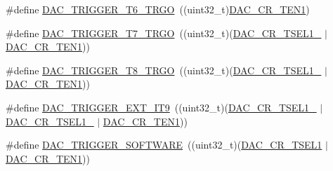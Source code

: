\begin{DoxyCompactItemize}
\item 
\#define \mbox{\hyperlink{group___d_a_c__trigger__selection_ga9321fce86df1db6d865fb4765a3cffa7}{D\+A\+C\+\_\+\+T\+R\+I\+G\+G\+E\+R\+\_\+\+T6\+\_\+\+T\+R\+GO}}~((uint32\+\_\+t)\mbox{\hyperlink{group___peripheral___registers___bits___definition_ga998aa4fd791ea2f4626df6ddc8fc7109}{D\+A\+C\+\_\+\+C\+R\+\_\+\+T\+E\+N1}})
\item 
\#define \mbox{\hyperlink{group___d_a_c__trigger__selection_ga474fb4e041fe94e863ce13c330e52912}{D\+A\+C\+\_\+\+T\+R\+I\+G\+G\+E\+R\+\_\+\+T7\+\_\+\+T\+R\+GO}}~((uint32\+\_\+t)(\mbox{\hyperlink{group___peripheral___registers___bits___definition_ga265e32c4fc43310acdf3ebea01376766}{D\+A\+C\+\_\+\+C\+R\+\_\+\+T\+S\+E\+L1\+\_}} $\vert$ \mbox{\hyperlink{group___peripheral___registers___bits___definition_ga998aa4fd791ea2f4626df6ddc8fc7109}{D\+A\+C\+\_\+\+C\+R\+\_\+\+T\+E\+N1}}))
\item 
\#define \mbox{\hyperlink{group___d_a_c__trigger__selection_gaa3cbf2d9ce08165ca49172a0a62d1a66}{D\+A\+C\+\_\+\+T\+R\+I\+G\+G\+E\+R\+\_\+\+T8\+\_\+\+T\+R\+GO}}~((uint32\+\_\+t)(\mbox{\hyperlink{group___peripheral___registers___bits___definition_ga8dfa13ec123c583136e24b7890add45b}{D\+A\+C\+\_\+\+C\+R\+\_\+\+T\+S\+E\+L1\+\_}} $\vert$ \mbox{\hyperlink{group___peripheral___registers___bits___definition_ga998aa4fd791ea2f4626df6ddc8fc7109}{D\+A\+C\+\_\+\+C\+R\+\_\+\+T\+E\+N1}}))
\item 
\#define \mbox{\hyperlink{group___d_a_c__trigger__selection_gaf7d4babe0dbcd473496ea913ee060ebb}{D\+A\+C\+\_\+\+T\+R\+I\+G\+G\+E\+R\+\_\+\+E\+X\+T\+\_\+\+I\+T9}}~((uint32\+\_\+t)(\mbox{\hyperlink{group___peripheral___registers___bits___definition_gaa625d7638422e90a616ac93edd4bf408}{D\+A\+C\+\_\+\+C\+R\+\_\+\+T\+S\+E\+L1\+\_}} $\vert$ \mbox{\hyperlink{group___peripheral___registers___bits___definition_ga265e32c4fc43310acdf3ebea01376766}{D\+A\+C\+\_\+\+C\+R\+\_\+\+T\+S\+E\+L1\+\_}} $\vert$ \mbox{\hyperlink{group___peripheral___registers___bits___definition_ga998aa4fd791ea2f4626df6ddc8fc7109}{D\+A\+C\+\_\+\+C\+R\+\_\+\+T\+E\+N1}}))
\item 
\#define \mbox{\hyperlink{group___d_a_c__trigger__selection_gaffd98a8de78794c9ffa837598977c6a7}{D\+A\+C\+\_\+\+T\+R\+I\+G\+G\+E\+R\+\_\+\+S\+O\+F\+T\+W\+A\+RE}}~((uint32\+\_\+t)(\mbox{\hyperlink{group___peripheral___registers___bits___definition_gaf951c1a57a1a19e356df57d908f09c6c}{D\+A\+C\+\_\+\+C\+R\+\_\+\+T\+S\+E\+L1}} $\vert$ \mbox{\hyperlink{group___peripheral___registers___bits___definition_ga998aa4fd791ea2f4626df6ddc8fc7109}{D\+A\+C\+\_\+\+C\+R\+\_\+\+T\+E\+N1}}))
\end{DoxyCompactItemize}


